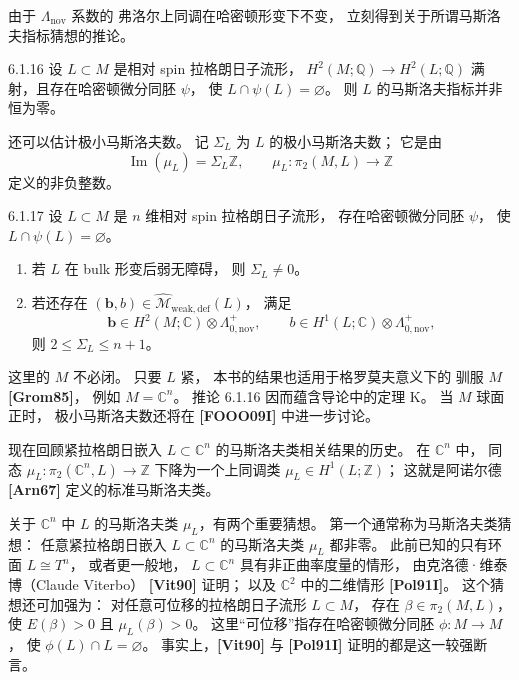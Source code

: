 由于 $\Lambda_{\mathrm{nov}}$ 系数的
弗洛尔上同调在哈密顿形变下不变，
立刻得到关于所谓马斯洛夫指标猜想的推论。

\begin{corollary}{6.1.16}\label{cor:6-1-16}
设 $L\subset M$ 是相对 spin 拉格朗日子流形，
$H^2(M;\mathbb Q)\to H^2(L;\mathbb Q)$
满射，且存在哈密顿微分同胚 $\psi$，
使 $L\cap\psi(L)=\varnothing$。
则 $L$ 的马斯洛夫指标并非恒为零。
\end{corollary}

还可以估计极小马斯洛夫数。
记 $\Sigma_L$ 为 $L$ 的极小马斯洛夫数；
它是由
\[
\operatorname{Im}(\mu_L)=\Sigma_L\mathbb Z,
\qquad
\mu_L:\pi_2(M,L)\longrightarrow\mathbb Z
\]
定义的非负整数。

\begin{theorem}{6.1.17}\label{thm:6-1-17}
设 $L\subset M$ 是 $n$ 维相对 spin
拉格朗日子流形，
存在哈密顿微分同胚 $\psi$，
使 $L\cap\psi(L)=\varnothing$。
\begin{enumerate}
\item[(1)] 若 $L$ 在 bulk 形变后弱无障碍，
则 $\Sigma_L\ne0$。
\item[(2)] 若还存在
$(\boldsymbol b,b)\in
\widehat{\mathcal M}_{\mathrm{weak,def}}(L)$，
满足
\[
\boldsymbol b\in H^2(M;\mathbb C)
\otimes\Lambda_{0,\mathrm{nov}}^+,
\qquad
b\in H^1(L;\mathbb C)
\otimes\Lambda_{0,\mathrm{nov}}^+,
\]
则 $2\le\Sigma_L\le n+1$。
\end{enumerate}
\end{theorem}

这里的 $M$ 不必闭。
只要 $L$ 紧，
本书的结果也适用于格罗莫夫意义下的
驯服 $M$ \textbf{[Grom85]}，
例如 $M=\mathbb C^n$。
推论 6.1.16 因而蕴含导论中的定理 K。
当 $M$ 球面正时，
极小马斯洛夫数还将在
\textbf{[FOOO09I]} 中进一步讨论。

现在回顾紧拉格朗日嵌入
$L\subset\mathbb C^n$
的马斯洛夫类相关结果的历史。
在 $\mathbb C^n$ 中，
同态
$\mu_L:\pi_2(\mathbb C^n,L)\to\mathbb Z$
下降为一个上同调类
$\mu_L\in H^1(L;\mathbb Z)$；
这就是阿诺尔德 \textbf{[Arn67]}
定义的标准马斯洛夫类。

关于 $\mathbb C^n$ 中 $L$ 的马斯洛夫类
$\mu_L$，有两个重要猜想。
第一个通常称为马斯洛夫类猜想：
任意紧拉格朗日嵌入
$L\subset\mathbb C^n$
的马斯洛夫类 $\mu_L$ 都非零。
此前已知的只有环面
$L\cong T^n$，
或者更一般地，
$L\subset\mathbb C^n$
具有非正曲率度量的情形，
由克洛德·维泰博（Claude Viterbo）
\textbf{[Vit90]} 证明；
以及 $\mathbb C^2$ 中的二维情形
\textbf{[Pol91I]}。
这个猜想还可加强为：
对任意可位移的拉格朗日子流形
$L\subset M$，
存在 $\beta\in\pi_2(M,L)$，
使 $E(\beta)>0$ 且 $\mu_L(\beta)>0$。
这里“可位移”指存在哈密顿微分同胚
$\phi:M\to M$，
使 $\phi(L)\cap L=\varnothing$。
事实上，\textbf{[Vit90]} 与
\textbf{[Pol91I]}
证明的都是这一较强断言。

